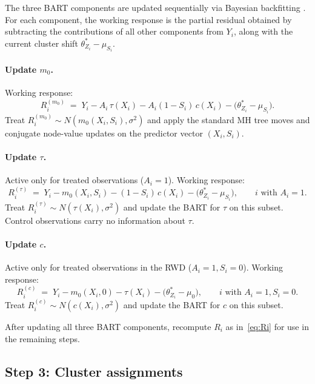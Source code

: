 \documentclass[11pt]{article}
\newcommand{\1}{\mathbf{1}}
\begin{document}
The three BART components are updated sequentially via Bayesian backfitting \citep{chipman2010bart}. For each component, the working response is the partial residual obtained by subtracting the contributions of all other components from $Y_i$, along with the current cluster shift $\theta_{Z_i}^* - \mu_{S_i}$.

\paragraph{Update $m_0$.} Working response:
\begin{equation}
R_i^{(m_0)} \;=\; Y_i - A_i\, \tau(X_i) - A_i(1 - S_i)\, c(X_i) - \big(\theta_{Z_i}^* - \mu_{S_i}\big).
\end{equation}
Treat $R_i^{(m_0)} \sim N(m_0(X_i, S_i), \sigma^2)$ and apply the standard MH tree moves and conjugate node-value updates on the predictor vector $(X_i, S_i)$.

\paragraph{Update $\tau$.} Active only for treated observations ($A_i = 1$). Working response:
\begin{equation}
R_i^{(\tau)} \;=\; Y_i - m_0(X_i, S_i) - (1 - S_i)\, c(X_i) - \big(\theta_{Z_i}^* - \mu_{S_i}\big), \qquad i \text{ with } A_i = 1.
\end{equation}
Treat $R_i^{(\tau)} \sim N(\tau(X_i), \sigma^2)$ and update the BART for $\tau$ on this subset. Control observations carry no information about $\tau$.

\paragraph{Update $c$.} Active only for treated observations in the RWD ($A_i = 1, S_i = 0$). Working response:
\begin{equation}
R_i^{(c)} \;=\; Y_i - m_0(X_i, 0) - \tau(X_i) - \big(\theta_{Z_i}^* - \mu_0\big), \qquad i \text{ with } A_i = 1, S_i = 0.
\end{equation}
Treat $R_i^{(c)} \sim N(c(X_i), \sigma^2)$ and update the BART for $c$ on this subset.

After updating all three BART components, recompute $R_i$ as in~\eqref{eq:Ri} for use in the remaining steps.

\subsection{Step 3: Cluster assignments}
\end{document}
